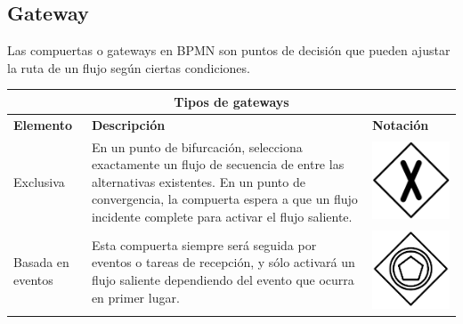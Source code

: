 \subsection{Gateway}
Las compuertas o gateways en BPMN son puntos de decisión que pueden ajustar la ruta de un flujo según ciertas condiciones.
\begin{table}[H]
	\centering
	\begin{tabular}{|p{2cm}|p{9.5cm}|p{1.7cm} |}
		\hline
		\multicolumn{3}{|c|}{Tipos de gateways} \\
		\hline
		\textbf{Elemento}& \textbf{Descripción}&\textbf{Notación}\\
		\hline
		{\small Exclusiva } & {\small En un punto de bifurcación, selecciona exactamente un flujo de secuencia de entre las alternativas existentes. En un punto de convergencia, la compuerta espera a que un flujo incidente complete para activar el flujo saliente.} & \vspace{0.5mm} \hspace{2mm} \includegraphics[scale=0.1]{Capitulo2/imagenes/gatewayE} \\
		
		\hline
		{\small Basada en eventos } & {\small Esta compuerta siempre será seguida por eventos o tareas de recepción, y sólo activará un flujo saliente dependiendo del evento que ocurra en primer lugar.} & \vspace{0.5mm} \hspace{2mm} \includegraphics[scale=0.1]{Capitulo2/imagenes/gatewayBE} \\
		

\end{tabular}
\end{table}
